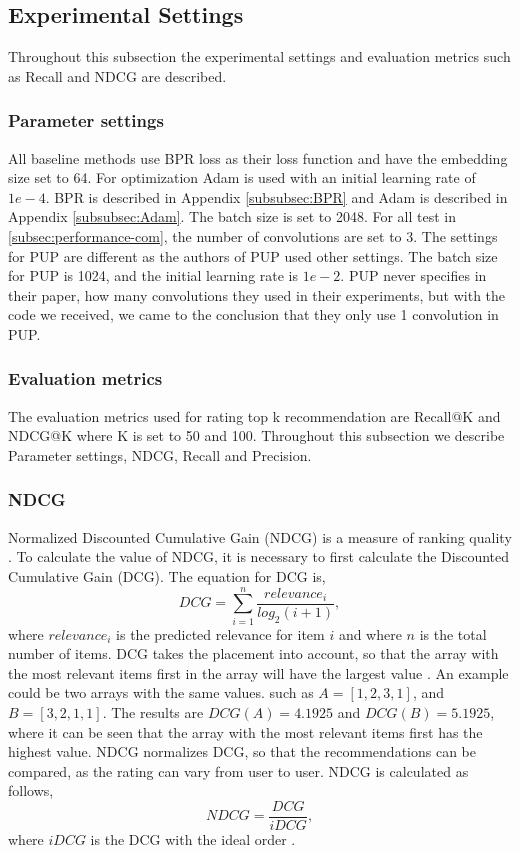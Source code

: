\subsection{Experimental Settings}
Throughout this subsection the experimental settings and evaluation metrics such as Recall and NDCG are described.

\subsubsection{Parameter settings}
All baseline methods use BPR loss as their loss function and have the embedding size set to 64.
For optimization Adam is used with an initial learning rate of $1e-4$.
BPR is described in Appendix \ref{subsubsec:BPR} and Adam is described in Appendix \ref{subsubsec:Adam}.
The batch size is set to 2048.
For all test in \autoref{subsec:performance-com}, the number of convolutions are set to 3.
The settings for PUP are different as the authors of PUP used other settings.
The batch size for PUP is 1024, and the initial learning rate is $1e-2$.
PUP never specifies in their paper, how many convolutions they used in their experiments, but with the code we received, we came to the conclusion that they only use 1 convolution in PUP.

\subsubsection{Evaluation metrics}
The evaluation metrics used for rating top k recommendation are Recall@K and NDCG@K where K is set to 50 and 100.
Throughout this subsection we describe Parameter settings, NDCG, Recall and Precision.

\subsubsection{NDCG}
Normalized Discounted Cumulative Gain (NDCG) is a measure of ranking quality \cite{NDCG-evaluation}.
To calculate the value of NDCG, it is necessary to first calculate the Discounted Cumulative Gain (DCG).
The equation for DCG is,
\begin{equation}
    DCG = \sum_{i=1}^{n} \frac{relevance_i}{log_2(i+1)},
\end{equation}
where $relevance_i$ is the predicted relevance for item $i$ and where $n$ is the total number of items.
DCG takes the placement into account, so that the array with the most relevant items first in the array will have the largest value \cite{NDCG-evaluation,Handbook}.
An example could be two arrays with the same values. such as $A = [1, 2, 3, 1]$, and $B = [3, 2, 1, 1]$. The results are $DCG(A) = 4.1925$ and $DCG(B) = 5.1925$, where it can be seen that the array with the most relevant items first has the highest value.
NDCG normalizes DCG, so that the recommendations can be compared, as the rating can vary from user to user.
NDCG is calculated as follows,
\begin{equation}
    NDCG = \frac{DCG}{iDCG},
\end{equation}
where $iDCG$ is the DCG with the ideal order \cite{NDCG-evaluation,Handbook}.

